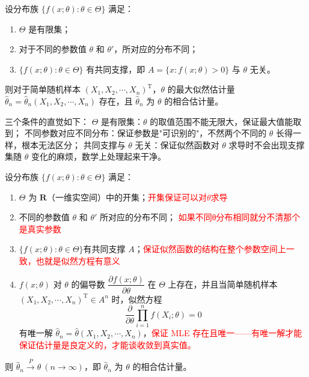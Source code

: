 \begin{theorem}[最大似然估计量的存在性与相合性]
设分布族 $\{f(x;\theta) : \theta \in \Theta\}$ 满足：
\begin{enumerate}
    \item $\Theta$ 是有限集；
    \item 对于不同的参数值 $\theta$ 和 $\theta'$，所对应的分布不同；
    \item $\{f(x;\theta) : \theta \in \Theta\}$ 有共同支撑，即 $A = \{x : f(x;\theta) > 0\}$ 与 $\theta$ 无关。
\end{enumerate}
则对于简单随机样本 $(X_1, X_2, \cdots, X_n)^{\mathrm{T}}$，$\theta$ 的最大似然估计量 $\hat{\theta}_n = \hat{\theta}_n(X_1, X_2, \cdots, X_n)$ 存在，且 $\hat{\theta}_n$ 为 $\theta$ 的相合估计量。
\end{theorem}
\begin{note}
三个条件的直觉如下：
$\Theta$ 是有限集：$\theta$ 的取值范围不能无限大，保证最大值能取到；
不同参数对应不同分布：保证参数是"可识别的"，不然两个不同的 $\theta$ 长得一样，根本无法区分；
共同支撑与 $\theta$ 无关：保证似然函数对 $\theta$ 求导时不会出现支撑集随 $\theta$ 变化的麻烦，数学上处理起来干净。
\end{note}
\begin{theorem}
设分布族 $\{f(x;\theta):\theta\in\Theta\}$ 满足：
\begin{enumerate}[(1)]
    \item $\Theta$ 为 $\mathbf{R}$（一维实空间）中的开集；\textcolor{red}{开集保证可以对$\theta$求导}
    \item 不同的参数值 $\theta$ 和 $\theta'$ 所对应的分布不同；
    \textcolor{red}{如果不同θ分布相同就分不清那个是真实参数}
    \item $\{f(x;\theta):\theta\in\Theta\}$有共同支撑 $A$；\textcolor{red}{保证似然函数的结构在整个参数空间上一致，也就是似然方程有意义}
    \item $f(x;\theta)$ 对 $\theta$ 的偏导数 $\dfrac{\partial f(x;\theta)}{\partial\theta}$ 在 $\Theta$ 上存在，并且当简单随机样本 $(X_1,X_2,\cdots,X_n)^\mathrm{T}\in A^n$ 时，似然方程
    $$
    \frac{\partial}{\partial\theta}\prod_{i=1}^n f(X_i;\theta) = 0
    $$
    有唯一解 $\hat{\theta}_n = \hat{\theta}(X_1,X_2,\cdots,X_n)$，\textcolor{red}{保证 MLE 存在且唯一——有唯一解才能保证估计量是良定义的，才能谈收敛到真实值。}
\end{enumerate}
则 $\hat{\theta}_n \xrightarrow{P} \theta\ (n\to\infty)$，即 $\hat{\theta}_n$ 为 $\theta$ 的相合估计量。
\end{theorem}

